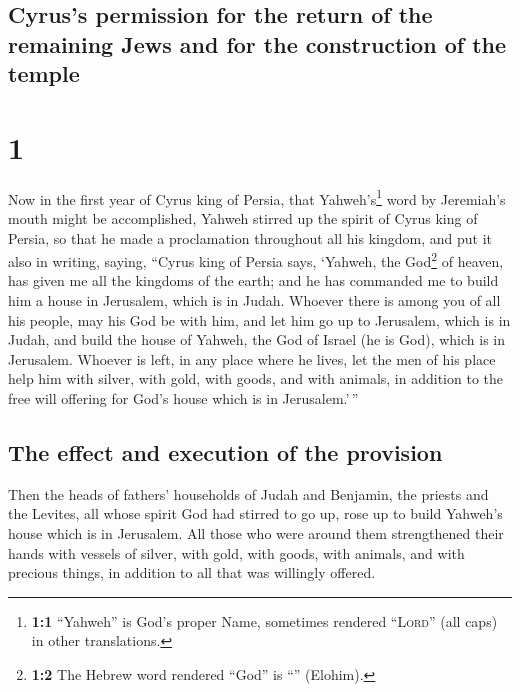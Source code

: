 \hypertarget{cyruss-permission-for-the-return-of-the-remaining-jews-and-for-the-construction-of-the-temple}{%
\subsection{Cyrus's permission for the return of the remaining Jews and
for the construction of the
temple}\label{cyruss-permission-for-the-return-of-the-remaining-jews-and-for-the-construction-of-the-temple}}

\hypertarget{section}{%
\section{1}\label{section}}

 Now in the first year of Cyrus king of Persia, that
Yahweh's\footnote{\textbf{1:1} ``Yahweh'' is God's proper Name,
  sometimes rendered ``\textsc{Lord}'' (all caps) in other translations.}
word by Jeremiah's mouth might be accomplished, Yahweh stirred up the
spirit of Cyrus king of Persia, so that he made a proclamation
throughout all his kingdom, and put it also in writing, saying,
 ``Cyrus king of Persia says, `Yahweh, the God\footnote{\textbf{1:2}
  The Hebrew word rendered ``God'' is ``'' (Elohim).} of
heaven, has given me all the kingdoms of the earth; and he has commanded
me to build him a house in Jerusalem, which is in Judah. 
Whoever there is among you of all his people, may his God be with him,
and let him go up to Jerusalem, which is in Judah, and build the house
of Yahweh, the God of Israel (he is God), which is in Jerusalem.
 Whoever is left, in any place where he lives, let the men
of his place help him with silver, with gold, with goods, and with
animals, in addition to the free will offering for God's house which is
in Jerusalem.'\,''

\hypertarget{the-effect-and-execution-of-the-provision}{%
\subsection{The effect and execution of the
provision}\label{the-effect-and-execution-of-the-provision}}

 Then the heads of fathers' households of Judah and
Benjamin, the priests and the Levites, all whose spirit God had stirred
to go up, rose up to build Yahweh's house which is in Jerusalem.
 All those who were around them strengthened their hands
with vessels of silver, with gold, with goods, with animals, and with
precious things, in addition to all that was willingly offered.

